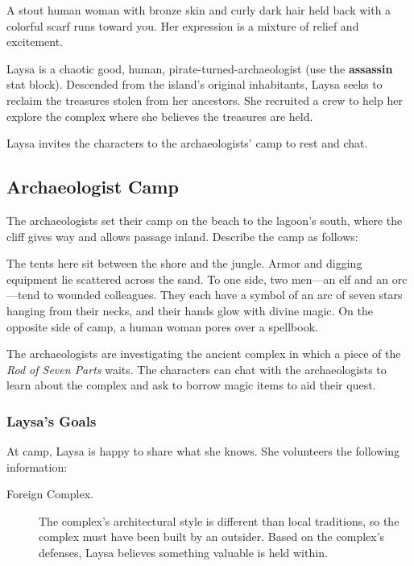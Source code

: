 \documentclass[10pt,a4paper,twoside,bg=print,twocolumn,openany,nodeprecatedcode]{dndbook}
\begin{document}
\begin{DndReadAloud}{}
A stout human woman with bronze skin and curly dark hair held back with a colorful scarf runs toward you. Her expression is a mixture of relief and excitement.

\end{DndReadAloud}

Laysa is a chaotic good, human, pirate-turned-archaeologist (use the \textbf{assassin} stat block). Descended from the island's original inhabitants, Laysa seeks to reclaim the treasures stolen from her ancestors. She recruited a crew to help her explore the complex where she believes the treasures are held.

Laysa invites the characters to the archaeologists' camp to rest and chat.

\subsection{Archaeologist Camp}
The archaeologists set their camp on the beach to the lagoon's south, where the cliff gives way and allows passage inland. Describe the camp as follows:

\begin{DndReadAloud}{}
The tents here sit between the shore and the jungle. Armor and digging equipment lie scattered across the sand. To one side, two men—an elf and an orc—tend to wounded colleagues. They each have a symbol of an arc of seven stars hanging from their necks, and their hands glow with divine magic. On the opposite side of camp, a human woman pores over a spellbook.

\end{DndReadAloud}

The archaeologists are investigating the ancient complex in which a piece of the \textit{Rod of Seven Parts} waits. The characters can chat with the archaeologists to learn about the complex and ask to borrow magic items to aid their quest.

\subsubsection{Laysa's Goals}
At camp, Laysa is happy to share what she knows. She volunteers the following information:


\begin{description}
\item[Foreign Complex.]
The complex's architectural style is different than local traditions, so the complex must have been built by an outsider. Based on the complex's defenses, Laysa believes something valuable is held within.
\end{description}
\end{document}
